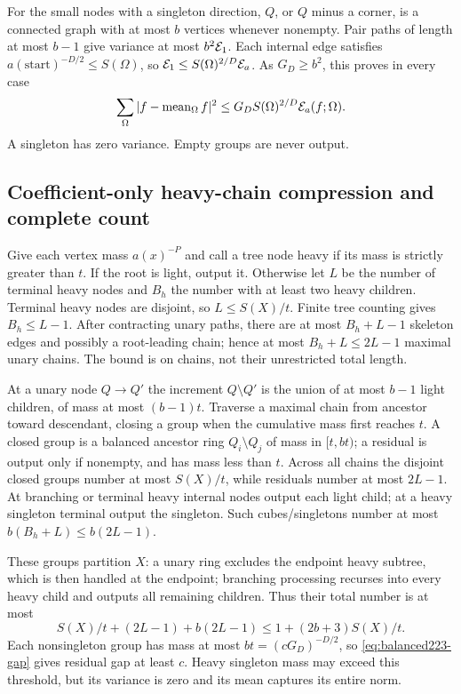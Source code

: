For the small nodes with a singleton direction, $Q$, or $Q$ minus a corner,
is a connected graph with at most $b$ vertices whenever nonempty. Pair paths
of length at most $b-1$ give variance at most $b^2\mathcal E_1$.
Each internal edge satisfies
$a(\mathrm{start})^{-D/2}\le S(\Omega)$, so
$\mathcal E_1\le S(\Omega)^{2/D}\mathcal E_a$. As $G_D\ge b^2$, this proves in every case
\begin{equation}\label{eq:balanced223-gap}
 \sum_\Omega|f-\operatorname{mean}_\Omega f|^2
 \le G_DS(\Omega)^{2/D}\mathcal E_a(f;\Omega).
\end{equation}
A singleton has zero variance. Empty groups are never output.

\subsection{Coefficient-only heavy-chain compression and complete count}
Give each vertex mass $a(x)^{-P}$ and call a tree node heavy if its mass is
strictly greater than $t$. If the root is light, output it. Otherwise let
$L$ be the number of terminal heavy nodes and $B_h$ the number with at
least two heavy children. Terminal heavy nodes are disjoint, so
$L\le S(X)/t$. Finite tree counting gives $B_h\le L-1$.
After contracting unary paths, there are at most $B_h+L-1$ skeleton edges
and possibly a root-leading chain; hence at most $B_h+L\le2L-1$ maximal
unary chains. The bound is on chains, not their unrestricted total length.

At a unary node $Q\to Q'$ the increment $Q\setminus Q'$ is the union of
at most $b-1$ light children, of mass at most $(b-1)t$. Traverse a maximal
chain from ancestor toward descendant, closing a group when the cumulative
mass first reaches $t$. A closed group is a balanced ancestor ring
$Q_i\setminus Q_j$ of mass in $[t,bt)$; a residual is output only if nonempty,
and has mass less than $t$. Across all chains the disjoint closed groups
number at most $S(X)/t$, while residuals number at most $2L-1$.
At branching or terminal heavy internal nodes output each light child;
at a heavy singleton terminal output the singleton. Such cubes/singletons
number at most $b(B_h+L)\le b(2L-1)$.

These groups partition $X$: a unary ring excludes the endpoint heavy
subtree, which is then handled at the endpoint; branching processing
recurses into every heavy child and outputs all remaining children.
Thus their total number is at most
\[
 S(X)/t+(2L-1)+b(2L-1)\le1+(2b+3)S(X)/t.
\]
Each nonsingleton group has mass at most
$bt=(cG_D)^{-D/2}$, so \eqref{eq:balanced223-gap} gives residual gap at least
$c$. Heavy singleton mass may exceed this threshold, but its variance is
zero and its mean captures its entire norm.

